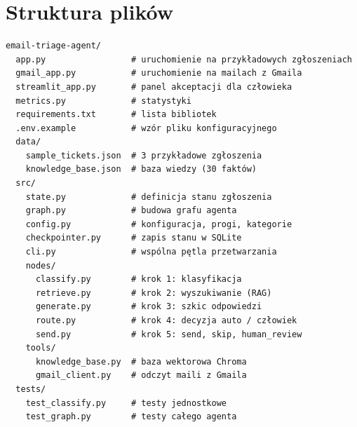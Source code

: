 \documentclass[11pt,a4paper]{article}
\begin{document}
\section{Struktura plików}

\begin{lstlisting}[language={}]
email-triage-agent/
  app.py                 # uruchomienie na przykładowych zgłoszeniach
  gmail_app.py           # uruchomienie na mailach z Gmaila
  streamlit_app.py       # panel akceptacji dla człowieka
  metrics.py             # statystyki
  requirements.txt       # lista bibliotek
  .env.example           # wzór pliku konfiguracyjnego
  data/
    sample_tickets.json  # 3 przykładowe zgłoszenia
    knowledge_base.json  # baza wiedzy (30 faktów)
  src/
    state.py             # definicja stanu zgłoszenia
    graph.py             # budowa grafu agenta
    config.py            # konfiguracja, progi, kategorie
    checkpointer.py      # zapis stanu w SQLite
    cli.py               # wspólna pętla przetwarzania
    nodes/
      classify.py        # krok 1: klasyfikacja
      retrieve.py        # krok 2: wyszukiwanie (RAG)
      generate.py        # krok 3: szkic odpowiedzi
      route.py           # krok 4: decyzja auto / człowiek
      send.py            # krok 5: send, skip, human_review
    tools/
      knowledge_base.py  # baza wektorowa Chroma
      gmail_client.py    # odczyt maili z Gmaila
  tests/
    test_classify.py     # testy jednostkowe
    test_graph.py        # testy całego agenta
\end{lstlisting}
\end{document}
